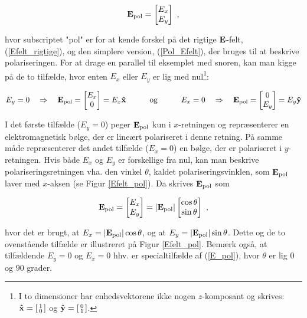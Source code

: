 \begin{equation}
\mathbf{E}_{\text{pol}} = \begin{bmatrix} E_x \\ E_y \end{bmatrix}
\label{Pol_Efelt} \ ,
\end{equation} 

\vspace{2mm}

hvor subscriptet "pol" er for at kende forskel på det rigtige $\mathbf{E}$-felt, (\ref{Efelt_rigtige}), og den simplere version, (\ref{Pol_Efelt}), der bruges til at beskrive polariseringen. For at drage en parallel til eksemplet med snoren, kan man kigge på de to tilfælde, hvor enten $E_x$ eller $E_y$ er lig med nul\footnote{I to dimensioner har enhedsvektorene ikke nogen $z$-komposant og skrives: $\mathbf{\hat{x}} = \begin{bsmallmatrix} 1 \\ 0 \\ \end{bsmallmatrix}$ og $\mathbf{\hat{y}} = \begin{bsmallmatrix} 0 \\ 1 \\ \end{bsmallmatrix}$.}:

$$E_y = 0 \quad \Rightarrow \quad \mathbf{E}_{\text{pol}} = \begin{bmatrix} E_x \\ 0 \end{bmatrix} = E_x \mathbf{\hat{x}} \quad \quad \quad \text{og} \quad \quad \quad E_x = 0 \quad \Rightarrow \quad \mathbf{E}_{\text{pol}} = \begin{bmatrix} 0 \\ E_y \end{bmatrix} = E_y \mathbf{\hat{y}}$$

\vspace{2mm}

I det første tilfælde ($E_y = 0$) peger $\mathbf{E}_{\text{pol}}$ kun i $x$-retningen og repræsenterer en elektromagnetisk bølge, der er lineært polariseret i denne retning. På samme måde repræsenterer det andet tilfælde ($E_x=0$) en bølge, der er polariseret i $y$-retningen. Hvis både $E_x$ og $E_y$ er forskellige fra nul, kan man beskrive polariseringsretningen vha. den vinkel $\theta$, kaldet polariseringsvinklen, som $\mathbf{E}_{\text{pol}}$ laver med $x$-aksen (se Figur \ref{Efelt_pol}). Da skrives $\mathbf{E}_{\text{pol}}$ som

\begin{equation}
\mathbf{E}_{\text{pol}} = \begin{bmatrix} E_x \\ E_y \end{bmatrix}   = | \mathbf{E}_{\text{pol}} | \begin{bmatrix} \cos \theta \\ \sin \theta \end{bmatrix} \ ,
\label{E_pol}
\end{equation}

\vspace{2mm}

hvor det er brugt, at $E_x = | \mathbf{E}_{\text{pol}} | \cos \theta$, og at $E_y = | \mathbf{E}_{\text{pol}} | \sin \theta$. Dette og de to ovenstående tilfælde er illustreret på Figur \ref{Efelt_pol}. Bemærk også, at tilfældende $E_y = 0$ og $E_x = 0$ hhv. er specialtilfælde af (\ref{E_pol}), hvor $\theta$ er lig $0$ og $90$ grader.\\

